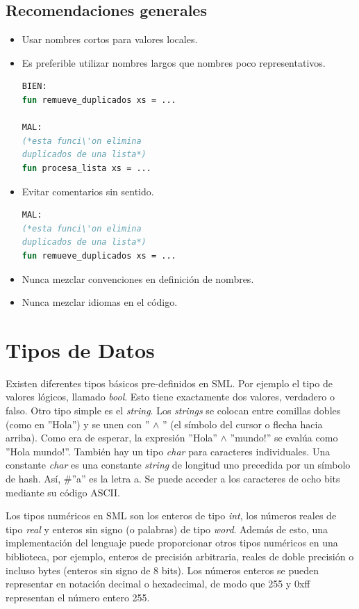 \documentclass[10pt,journal,compsoc]{IEEEtran}
\begin{document}
\subsection{Recomendaciones generales}
\begin{itemize}
	\item Usar nombres cortos para valores locales.
	\item Es preferible utilizar nombres largos que nombres poco representativos.
\begin{lstlisting}[language=ML, caption=Recomendaci\'on nombres]
BIEN:
fun remueve_duplicados xs = ...	

MAL:
(*esta funci\'on elimina
duplicados de una lista*)
fun procesa_lista xs = ...
\end{lstlisting}
	\item Evitar comentarios sin sentido.
\begin{lstlisting}[language=ML, caption=Recomendaci\'on comentarios]
MAL:
(*esta funci\'on elimina
duplicados de una lista*)
fun remueve_duplicados xs = ...	
\end{lstlisting}
	\item Nunca mezclar convenciones en definici\'on de nombres.
	\item Nunca mezclar idiomas en el c\'odigo.
\end{itemize}

\section{Tipos de Datos}
Existen diferentes tipos b\'asicos pre-definidos en SML. Por ejemplo el tipo de valores l\'ogicos, llamado \textit{bool}. Esto tiene exactamente dos valores, verdadero o falso. Otro tipo simple es el \textit{string}. Los \textit{strings} se colocan entre comillas dobles (como en ''Hola'') y se unen con '' $\wedge$  '' (el símbolo del cursor o flecha hacia arriba). Como era de esperar, la expresión ''Hola'' $\wedge$ ''mundo!'' se eval\'ua como ''Hola mundo!''. Tambi\'en hay un tipo \textit{char} para caracteres individuales. Una constante \textit{char} es una constante \textit{string} de longitud uno precedida por un s\'imbolo de hash. As\'i, \#''a'' es la letra a. Se puede acceder a los caracteres de ocho bits mediante su c\'odigo ASCII.

Los tipos numéricos en SML son los enteros de tipo \textit{int}, los n\'umeros reales de tipo \textit{real} y enteros sin signo (o palabras) de tipo \textit{word}. Adem\'as de esto, una implementaci\'on del lenguaje puede proporcionar otros tipos num\'ericos en una biblioteca, por ejemplo, enteros de precisi\'on arbitraria, reales de doble precisi\'on o incluso bytes (enteros sin signo de 8 bits). Los n\'umeros enteros se pueden representar en notaci\'on decimal o hexadecimal, de modo que 255 y 0xff representan el n\'umero entero 255.
\end{document}
